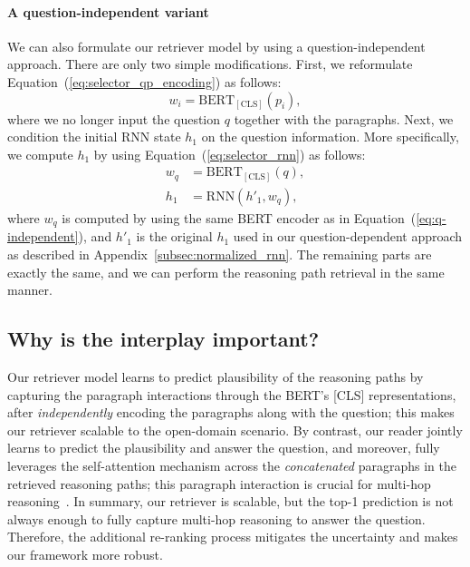 \paragraph{A question-independent variant}
We can also formulate our retriever model by using a question-independent approach.
There are only two simple modifications.
First, we reformulate Equation~(\ref{eq:selector_qp_encoding}) as follows:
\begin{equation}
\label{eq:q-independent}
w_{i} = \mathrm{BERT}_\mathrm{[CLS]}(p_i),
\end{equation}
where we no longer input the question $q$ together with the paragraphs.
Next, we condition the initial RNN state $h_1$ on the question information.
More specifically, we compute $h_1$ by using Equation~(\ref{eq:selector_rnn}) as follows:
\begin{align}
w_q   &= \mathrm{BERT}_\mathrm{[CLS]}(q), \\
h_{1} &= \mathrm{RNN}(h'_1, w_q),
\end{align}
where $w_q$ is computed by using the same BERT encoder as in Equation~(\ref{eq:q-independent}), and $h'_1$ is the original $h_1$ used in our question-dependent approach as described in Appendix~\ref{subsec:normalized_rnn}.
The remaining parts are exactly the same, and we can perform the reasoning path retrieval in the same manner.

\subsection{Why is the interplay important?}
\label{subsec:appendix_interplay}
Our retriever model learns to predict plausibility of the reasoning paths by capturing the paragraph interactions through the BERT's [CLS] representations, after {\it independently} encoding the paragraphs along with the question; this makes our retriever scalable to the open-domain scenario. 
By contrast, our reader jointly learns to predict the plausibility and answer the question, and moreover, fully leverages the self-attention mechanism across the {\it concatenated} paragraphs in the retrieved reasoning paths; this paragraph interaction is crucial for multi-hop reasoning~\citep{wang-etal-2019-multi-hop}.
In summary, our retriever is scalable, but the top-1 prediction is not always enough to fully capture multi-hop reasoning to answer the question.
Therefore, the additional re-ranking process mitigates the uncertainty and makes our framework more robust.

